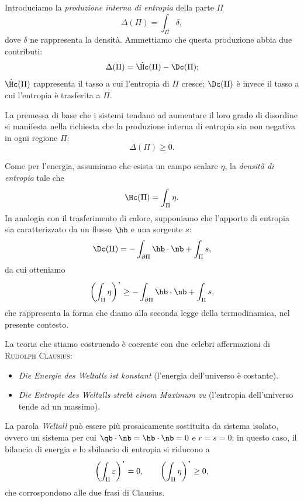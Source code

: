 Introduciamo la \textit{produzione interna di entropia} della parte $\Pi$
\begin{equation}
\Delta (\Pi)=\int_{\Pi}\delta,
\end{equation}
dove $\delta$ ne rappresenta la densità. Ammettiamo che questa produzione  abbia due contributi:
\begin{equation}
\Delta(\Pi)= \dot{\Hc}(\Pi)-\Dc(\Pi);
\end{equation}
$\dot{\Hc}(\Pi)$ rappresenta il tasso a cui l'entropia di $\Pi$ cresce; $\Dc(\Pi)$ è invece il tasso a cui l'entropia è trasferita a $\Pi$.

La premessa di base che i sistemi tendano ad aumentare il loro grado di disordine si manifesta nella richiesta che la produzione interna di entropia sia non negativa in ogni regione $\Pi$:
\begin{equation}
	\Delta(\Pi)\geq 0.
\end{equation}

Come per l'energia, assumiamo che esista un campo scalare $\eta$, la \textit{densità di entropia} tale che 
\begin{equation}
	\Hc(\Pi)=\int_{\Pi}\eta.
\end{equation} 
In analogia con il trasferimento di calore, supponiamo che l'apporto di entropia sia caratterizzato da un flusso $\hb$ e una sorgente $s$:
\begin{equation}
	\Dc(\Pi)=-\int_{\partial\Pi}\hb \cdot \nb +\int_{\Pi} s,
\end{equation}
da cui otteniamo
\begin{equation}\label{sbentr}
\left( \int_{\Pi}\eta \right)^{\mathop{\vcenter{\hbox{\Large$\cdot$}}}}\geq -\int_{\partial\Pi}\hb \cdot \nb +\int_{\Pi} s,
\end{equation}
che rappresenta la forma che diamo alla seconda legge della termodinamica, nel presente contesto.

\begin{remark}
La teoria che stiamo costruendo è coerente con due celebri affermazioni di \textsc{Rudolph Clausius}:
\begin{itemize}
	\item \textit{Die Energie des Weltalls ist konstant }(l'energia dell'universo è costante).
	\item \textit{Die Entropie des Weltalls strebt einem Maximum zu}  (l'entropia dell'universo tende ad un massimo).
\end{itemize}
La parola \textit{Weltall} può essere più prosaicamente sostituita da sistema isolato, ovvero un sistema per cui $\qb\cdot \nb=\hb\cdot \nb=0$ e $r=s=0$; in questo caso, il bilancio di energia e lo sbilancio di entropia si riducono a 
\begin{equation}
\left(\int_{\Pi}\varepsilon\right)^{\mathop{\vcenter{\hbox{\Large$\cdot$}}}}=0, \qquad \left( \int_{\Pi}\eta \right)^{\mathop{\vcenter{\hbox{\Large$\cdot$}}}}\geq 0,
\end{equation}
che corrospondono alle due frasi di Clausius.
\end{remark}

